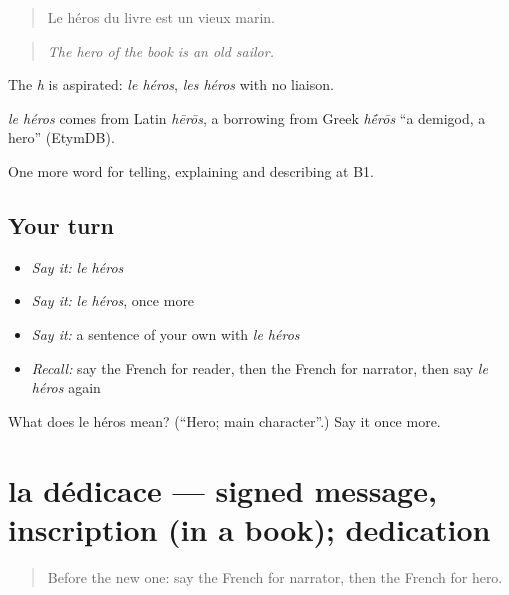 \begin{quote}
Le héros du livre est un vieux marin.
\end{quote}

\begin{quote}
\emph{The hero of the book is an old sailor.}
\end{quote}

The \emph{h} is aspirated: \emph{le héros}, \emph{les héros} with no liaison.

\begin{cousinweb}
\emph{le héros} comes from Latin \emph{hērōs}, a borrowing from Greek \emph{h\'{\={e}}rōs} \textquotedblleft{}a demigod, a hero\textquotedblright{} (EtymDB).
\end{cousinweb}

\begin{grammarlens}[title={What you've built}]
One more word for telling, explaining and describing at B1.
\end{grammarlens}

\subsection*{Your turn}
\begin{itemize}
\raggedright
  \item \emph{Say it:} \emph{le héros}
  \item \emph{Say it:} \emph{le héros}, once more
  \item \emph{Say it:} a sentence of your own with \emph{le héros}
  \item \emph{Recall:} say the French for reader, then the French for narrator, then say \emph{le héros} again
\end{itemize}

\begin{tcolorbox}[breakable,colback=teal!4,colframe=teal!35!black,title={Before you move on}]
What does le héros mean? (\textquotedblleft{}Hero; main character\textquotedblright{}.) Say it once more.
\end{tcolorbox}
\section[la dédicace]{la dédicace — signed message, inscription (in a book); dedication}

\label{lesson:FR-C521-dedicace}



\begin{quote}
Before the new one: say the French for narrator, then the French for hero.
\end{quote}

